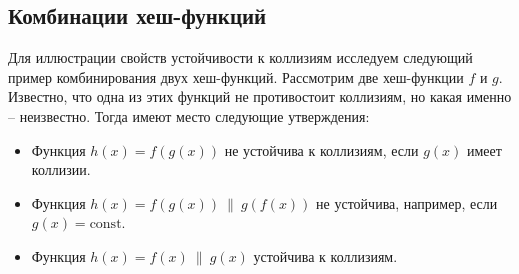 \subsection{Комбинации хеш-функций}

Для иллюстрации свойств устойчивости к коллизиям исследуем следующий пример комбинирования двух хеш-функций. Рассмотрим две хеш-функции $f$ и $g$. Известно, что одна из этих функций не противостоит коллизиям, но какая именно -- неизвестно. Тогда имеют место следующие утверждения:
\begin{itemize}
    \item Функция $h(x) = f(g(x))$ не устойчива к коллизиям, если $g(x)$ имеет коллизии.
    \item Функция $h(x) = f(g(x)) ~\|~ g(f(x))$ не устойчива, например, если $g(x) = \textrm{const}$.
    \item Функция $h(x) = f(x) ~\|~ g(x)$ устойчива к коллизиям.
\end{itemize}
